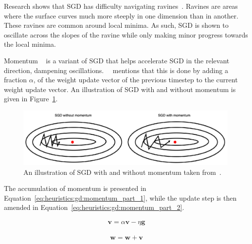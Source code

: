 Research shows that \acs{SGD} has difficulty navigating ravines~\cite{ref:sutton:1986}. Ravines are areas where the surface curves much more steeply in one dimension than in another. These ravines are common around local minima. As such, \acs{SGD} is shown to oscillate across the slopes of the ravine while only making minor progress towards the local minima.

\Acs{Momentum} ~\cite{ref:qian:1999} is a variant of \acs{SGD} that helps accelerate \acs{SGD} in the relevant direction, dampening oscillations.~\citeauthor{ref:ruder:2016}~\cite{ref:ruder:2016} mentions that this is done by adding a fraction $\alpha$, of the weight update vector of the previous timestep to the current weight update vector. An illustration of \acs{SGD} with and without momentum is given in Figure~\ref{fig:heuristics:gd:sgd_with_and_without_momentum}.

\begin{figure}[htbp]
      \centering
      \includegraphics[width=0.99\textwidth]{images/sgd_with_and_without_momentum.pdf}
      \caption{An illustration of \acf{SGD} with and without momentum taken from~\cite{ref:du:2019}.}
      \label{fig:heuristics:gd:sgd_with_and_without_momentum}
\end{figure}

The accumulation of momentum is presented in Equation~\eqref{eq:heuristics:gd:momentum_part_1}, while the update step is then amended in Equation~\eqref{eq:heuristics:gd:momentum_part_2}.

\begin{equation}
      \label{eq:heuristics:gd:momentum_part_1}
      \begin{split}
            \boldsymbol{v} = \alpha \boldsymbol{v} - \eta \boldsymbol{g}
      \end{split}
\end{equation}

\begin{equation}
      \label{eq:heuristics:gd:momentum_part_2}
      \begin{split}
            \boldsymbol{w} = \boldsymbol{w} + \boldsymbol{v}
      \end{split}
\end{equation}

